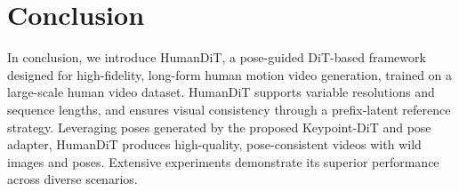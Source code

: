 \section{Conclusion}
\label{sec:conclusion}

In conclusion, we introduce HumanDiT, a pose-guided DiT-based framework designed for high-fidelity, long-form human motion video generation, trained on a large-scale human video dataset. HumanDiT supports variable resolutions and sequence lengths, and ensures visual consistency through a prefix-latent reference strategy. Leveraging poses generated by the proposed Keypoint-DiT and pose adapter, HumanDiT produces high-quality, pose-consistent videos with wild images and poses. Extensive experiments demonstrate its superior performance across diverse scenarios.